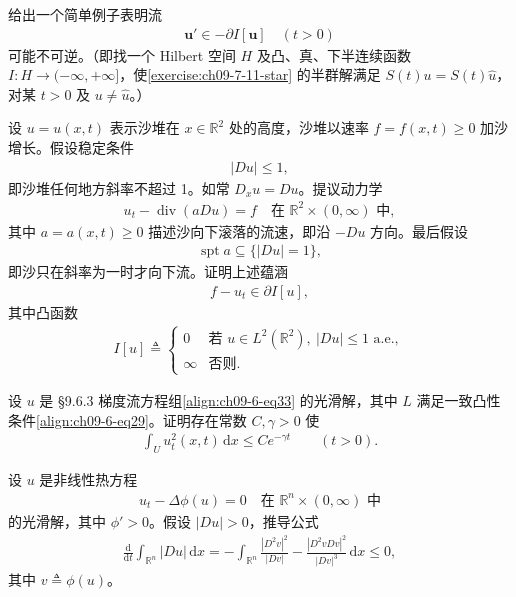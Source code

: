 \documentclass[../../main.tex]{subfiles}
\begin{document}
\begin{exercise}\label{exercise:ch09-7-11}
给出一个简单例子表明流
\begin{align}
\mathbf{u}'\in-\partial I[\mathbf{u}]\quad (t>0)\label{exercise:ch09-7-11-star}
\end{align}
可能不可逆。（即找一个 Hilbert 空间 $H$ 及凸、真、下半连续函数 $I:H\to(-\infty,+\infty]$，使\eqref{exercise:ch09-7-11-star} 的半群解满足 $S(t)u=S(t)\widehat{u}$，对某 $t>0$ 及 $u\neq\widehat{u}$。）
\end{exercise}

\begin{exercise}\label{exercise:ch09-7-12}
设 $u=u(x,t)$ 表示沙堆在 $x\in\mathbb{R}^2$ 处的高度，沙堆以速率 $f=f(x,t)\geqslant 0$ 加沙增长。假设稳定条件
\begin{align*}
|Du|\leqslant 1,
\end{align*}
即沙堆任何地方斜率不超过 1。如常 $D_xu=Du$。提议动力学
\begin{align*}
u_t-\operatorname{div}(aDu)=f\quad\text{在 }\mathbb{R}^2\times(0,\infty)\text{ 中},
\end{align*}
其中 $a=a(x,t)\geqslant 0$ 描述沙向下滚落的流速，即沿 $-Du$ 方向。最后假设
\begin{align*}
\operatorname{spt}a\subseteq\{|Du|=1\},
\end{align*}
即沙只在斜率为一时才向下流。证明上述蕴涵
\begin{align*}
f-u_t\in\partial I[u],
\end{align*}
其中凸函数
\begin{align*}
I[u]\triangleq\begin{cases}0&\text{若 }u\in L^2(\mathbb{R}^2),\ |Du|\leqslant 1\text{ a.e.},\\ \infty&\text{否则}.\end{cases}
\end{align*}
\end{exercise}

\begin{exercise}\label{exercise:ch09-7-13}
设 $u$ 是 \S9.6.3 梯度流方程组\eqref{align:ch09-6-eq33} 的光滑解，其中 $L$ 满足一致凸性条件\eqref{align:ch09-6-eq29}。证明存在常数 $C,\gamma>0$ 使
\begin{align*}
\int_U u_t^2(x,t)\,\mathrm{d}x\leqslant Ce^{-\gamma t}\qquad (t>0).
\end{align*}
\end{exercise}

\begin{exercise}\label{exercise:ch09-7-14}
设 $u$ 是非线性热方程
\begin{align*}
u_t-\Delta\phi(u)=0\quad\text{在 }\mathbb{R}^n\times(0,\infty)\text{ 中}
\end{align*}
的光滑解，其中 $\phi'>0$。假设 $|Du|>0$，推导公式
\begin{align*}
\frac{\mathrm{d}}{\mathrm{d}t}\int_{\mathbb{R}^n}|Du|\,\mathrm{d}x=-\int_{\mathbb{R}^n}\frac{|D^2v|^2}{|Dv|}-\frac{|D^2vDv|^2}{|Dv|^3}\,\mathrm{d}x\leqslant 0,
\end{align*}
其中 $v\triangleq\phi(u)$。
\end{exercise}
\end{document}
